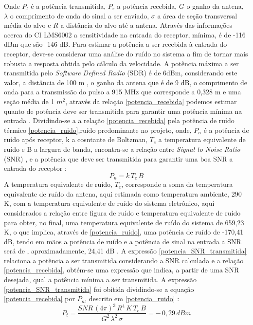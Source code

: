 Onde $P_t$ é a potência transmitida, $P_r$ a potência recebida, $G$ o ganho da antena, $\lambda$ o comprimento de onda do sinal a ser enviado, $\sigma$ a área de seção transversal média do alvo e $R$ a distância do alvo até a antena.
Através das informações acerca do CI LMS6002 a sensitividade na entrada do receptor, mínima, é de -116 dBm que são -146 dB. Para estimar a potência a ser recebida à entrada do receptor, deve-se considerar uma análise do ruído no sistema a fim de tornar mais robusta a resposta obtida pelo cálculo da velocidade.
A potência máxima a ser transmitida pelo  \emph{Software Defined Radio} (SDR) é de 6dBm, considerando este valor, a distância de 100 m , o ganho da antena que é de 9 dB, o comprimento de onda para a transmissão do pulso a 915 MHz que corresponde a 0,328 m e uma seção média de 1 $m^2$, através da relação \ref{potencia_recebida} podemos estimar quanto de potência deve ser transmitida para garantir uma potência mínima na entrada \cite{richards}.
Dividindo-se a a relação \ref{potencia_recebida} pela potência de ruído térmico \ref{potencia_ruido},ruído predominante no projeto, onde, $P_n$ é a potência de ruído após receptor, k a cosntante de Boltzman, $T_e$ a temperatura equivalente de ruído e B a largura de banda, encontra-se a relação entre \emph{Signal to Noise Ratio} (SNR) \cite{vasilescu}, e a potência que deve ser transmitida para garantir uma boa SNR a entrada do receptor  \cite{richards} :
\begin{equation}\label{potencia_ruido}
    P_n = k\, T_e\,B
\end{equation}
A temperatura equivalente de ruído, $T_e$, corresponde a soma da temperatura equivalente de ruído da antena, aqui estimada como temperatura ambiente, 290 K, com a temperatura equivalente de ruído do sistema eletrônico, aqui considerados a relação entre figura de ruído e temperatura equivalente de ruído para obter, no final, uma temperatura equivalente de ruído do sistema de 659,23 K, o que implica, através de \ref{potencia_ruido}, uma potência de ruído de -170,41 dB, tendo em mãos a potência de ruído e a potência de sinal na entrada a SNR será de , aproximadamente, 24,41 dB .
A expressão \ref{potencia_SNR_transmitida} relaciona a potência a ser transmitida considerando a SNR calculada e a relação \ref{potencia_recebida}, obtém-se uma expressão que indica, a partir de uma SNR desejada, qual a potência mínima a ser transmitida. A expressão \ref{potencia_SNR_transmitida} foi obitida dividindo-se a equação \ref{potencia_recebida} por $P_n$, descrito em \ref{potencia_ruido}  \cite{richards}:
\begin{equation}\label{potencia_SNR_transmitida}
    P_t = \frac{ SNR\,(4\pi)^{3}\,R^{4}\,K\,T_e\,B}{G^{2}\,   \lambda^{2}\, \sigma }  = -\,0,29\,dBm
\end{equation}
